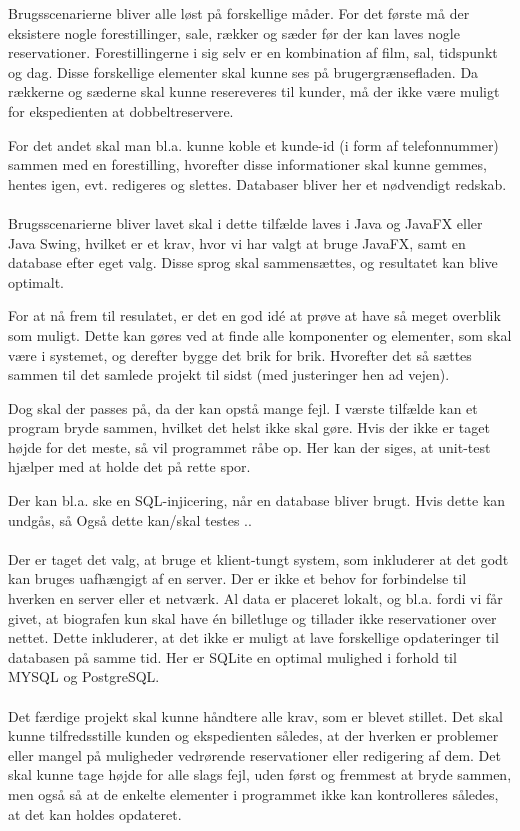 Brugsscenarierne bliver alle løst på forskellige måder. For det første må der eksistere nogle forestillinger, sale, rækker og sæder før der kan laves nogle reservationer. Forestillingerne i sig selv er en kombination af film, sal, tidspunkt og dag. Disse forskellige elementer skal kunne ses på brugergrænsefladen. Da rækkerne og sæderne skal kunne resereveres til kunder, må der ikke være muligt for ekspedienten at dobbeltreservere.

For det andet skal man bl.a. kunne koble et kunde-id (i form af telefonnummer) sammen med en forestilling, hvorefter disse informationer skal kunne gemmes, hentes igen, evt. redigeres og slettes. Databaser bliver her et nødvendigt redskab.
\\\\
Brugsscenarierne bliver lavet %
skal i dette tilfælde laves i Java og JavaFX eller Java Swing, hvilket er et krav, hvor vi har valgt at bruge JavaFX, samt en database efter eget valg. Disse sprog skal sammensættes, og resultatet kan blive optimalt.

For at nå frem til resulatet, er det en god idé at prøve at have så meget overblik som muligt. Dette kan gøres ved at finde alle komponenter og elementer, som skal være i systemet, og derefter bygge det brik for brik. Hvorefter det så sættes sammen til det samlede projekt til sidst (med justeringer hen ad vejen).

Dog skal der passes på, da der kan opstå mange fejl. I værste tilfælde kan et program bryde sammen, hvilket det helst ikke skal gøre. Hvis der ikke er taget højde for det meste, så vil programmet råbe op. Her kan der siges, at unit-test hjælper med at holde det på rette spor. 

Der kan bl.a. ske en SQL-injicering, når en database bliver brugt. Hvis dette kan undgås, så %
Også dette kan/skal testes .. 
\\\\
Der er taget det valg, at bruge et klient-tungt system, som inkluderer at det godt kan bruges uafhængigt af en server. Der er ikke et behov for forbindelse til hverken en server eller et netværk. Al data er placeret lokalt, og bl.a. fordi vi får givet, at biografen kun skal have én billetluge og tillader ikke reservationer over nettet. Dette inkluderer, at det ikke er muligt at lave forskellige opdateringer til databasen på samme tid. Her er SQLite en optimal mulighed i forhold til MYSQL og PostgreSQL.
\\\\
Det færdige projekt skal kunne håndtere alle krav, som er blevet stillet. Det skal kunne tilfredsstille kunden og ekspedienten således, at der hverken er problemer eller mangel på muligheder vedrørende reservationer eller redigering af dem. Det skal kunne tage højde for alle slags fejl, uden først og fremmest at bryde sammen, men også så at de enkelte elementer i programmet ikke kan kontrolleres således, at det kan holdes opdateret.
